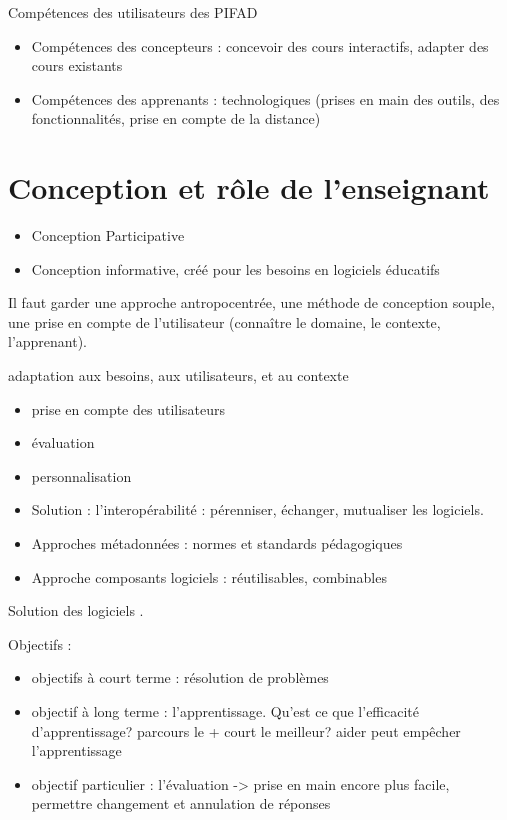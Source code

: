 \documentclass[11pt]{article}
\begin{document}
Compétences des utilisateurs des PIFAD
\begin{itemize}
	\item Compétences des concepteurs : concevoir des cours interactifs, adapter des cours existants
	\item Compétences des apprenants : technologiques (prises en main des outils, des fonctionnalités, prise en compte de la distance)
\end{itemize}


\newpage

\section{Conception et rôle de l'enseignant}

\begin{itemize}
	\item Conception Participative
	\item Conception informative, créé pour les besoins en logiciels éducatifs
\end{itemize}

\vskip 1cm
Il faut garder une approche antropocentrée, une méthode de conception souple, une prise en compte de l'utilisateur (connaître le domaine, le contexte, l'apprenant).

adaptation aux besoins, aux utilisateurs, et au contexte
\begin{itemize}
	\item prise en compte des utilisateurs
	\item évaluation
	\item personnalisation
\end{itemize}

\vskip 2cm
\begin{itemize}
	\item Solution : l'interopérabilité : pérenniser, échanger, mutualiser les logiciels.
	\item Approches métadonnées : normes et standards pédagogiques
	\item Approche composants logiciels : réutilisables, combinables
\end{itemize}

Solution des logiciels .

\vskip 2cm
Objectifs :
\begin{itemize}
	\item objectifs à court terme : résolution de problèmes
	\item objectif à long terme : l'apprentissage. Qu'est ce que l'efficacité d'apprentissage? parcours le + court le meilleur? aider peut empêcher l'apprentissage
	\item objectif particulier : l'évaluation -> prise en main encore plus facile, permettre changement et annulation de réponses
\end{itemize}
\end{document}
